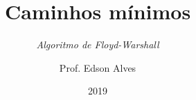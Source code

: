 \title{Caminhos mínimos}
\subtitle{\textit{Algoritmo de Floyd-Warshall}}
\date{2019}
\author{Prof. Edson Alves}
